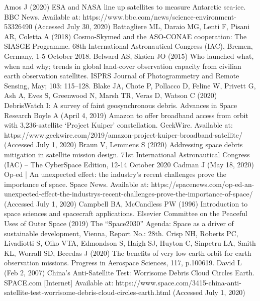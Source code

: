 \documentclass[12pt,a4paper,notitlepage,twoside,openright]{report}
\begin{document}
\begin{thebibliography}{100}
\bigskip

 Amos J (2020) ESA and NASA line up satellites to measure Antarctic sea-ice. BBC News. Available at: https://www.bbc.com/news/science-environment-53326490 (Accessed July 30, 2020)
 Battagliere ML, Daraio MG, Lenti F, Pisani AR, Coletta A (2018) Cosmo-Skymed and the ASO-CONAE cooperation: The SIASGE Programme. 68th International Astronautical Congress (IAC), Bremen, Germany, 1-5 October 2018.
 Belward AS, Skøien JO (2015) Who launched what, when and why; trends in global land-cover observation capacity from civilian earth observation satellites. ISPRS Journal of Photogrammetry and Remote Sensing, May; 103: 115–128.
 Blake JA, Chote P, Pollacco D, Feline W, Privett G, Ash A, Eves S, Greenwood N, Marsh TR, Veras D, Watson C (2020) DebrisWatch I: A survey of faint geosynchronous debris. Advances in Space Research
 Boyle A (April 4, 2019) Amazon to offer broadband access from orbit with 3,236-satellite ‘Project Kuiper’ constellation. GeekWire. Available at: https://www.geekwire.com/2019/amazon-project-kuiper-broadband-satellite/ (Accessed July 1, 2020)
 Braun V, Lemmens S (2020) Addressing space debris mitigation in satellite mission design. 71st International Astronautical Congress (IAC) – The CyberSpace Edition, 12-14 October 2020
 Cadman J (May 18, 2020) Op-ed | An unexpected effect: the industry’s recent challenges prove the importance of space. Space News. Available at: https://spacenews.com/op-ed-an-unexpected-effect-the-industrys-recent-challenges-prove-the-importance-of-space/ (Accessed July 1, 2020)
 Campbell BA, McCandless PW (1996) Introduction to space sciences and spacecraft applications. Elsevier
 Committee on the Peaceful Uses of Outer Space (2019) The “Space2030” Agenda: Space as a driver of sustainable development, Vienna, Report No.: 28th.
 Crisp NH, Roberts PC, Livadiotti S, Oiko VTA, Edmondson S, Haigh SJ, Huyton C, Sinpetru LA, Smith KL, Worrall SD, Becedas J (2020) The benefits of very low earth orbit for earth observation missions. Progress in Aerospace Sciences, 117, p.100619.
 David L (Feb 2, 2007) China's Anti-Satellite Test: Worrisome Debris Cloud Circles Earth. SPACE.com [Internet] Available at: https://www.space.com/3415-china-anti-satellite-test-worrisome-debris-cloud-circles-earth.html (Accessed July 1, 2020)

\end{thebibliography}
\end{document}
